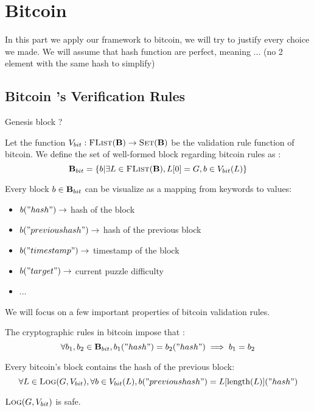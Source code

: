 
\section{Bitcoin}
In this part we apply our framework to bitcoin, we will try to justify every choice we made. 
We will assume that hash function are perfect, meaning ... (no 2 element with the same hash to simplify)

\subsection{Bitcoin 's Verification Rules}
Genesis block ?

Let the function $V_{bit} : \text{\sc FList}(\text{\bf B}) \rightarrow \text{\sc Set}(\text{\bf B})$ be the validation rule function of bitcoin. 
We define the set of well-formed block regarding bitcoin rules as : 
$$\text{\bf B}_{bit} = \{b| \exists L \in \text{\sc FList}(\text{\bf B}), L[0] = G, b \in V_{bit}(L) \}$$

\begin{mylem*}
	Every block $b \in \text{\bf B}_{bit}$ can be visualize as a mapping from keywords to values: 
	\begin{itemize}
		\item $b("hash") \rightarrow$ hash of the block
		\item $b("previous hash") \rightarrow$ hash of the previous block
		\item $b("timestamp") \rightarrow$ timestamp of the block
		\item $b("target") \rightarrow$ current puzzle difficulty
		\item ...
	\end{itemize}
\end{mylem*}

We will focus on a few important properties of bitcoin validation rules.
\begin{mylem*}
	The cryptographic rules in bitcoin impose that :
	$$ \forall b_1,b_2 \in \text{\bf B}_{bit}, b_1("hash")=b_2("hash") \implies b_1 = b_2 $$
\end{mylem*}

\begin{mylem*}
	Every bitcoin's block contains the hash of the previous block:
	$$\forall L \in \text{\sc Log}(G,V_{bit}), \forall b \in V_{bit}(L),b("previous hash") = L[\text{\rm length}(L)]("hash") $$
\end{mylem*}

\begin{myprop}
	$\text{\sc Log}(G,V_{bit})$ is safe.
\end{myprop}

